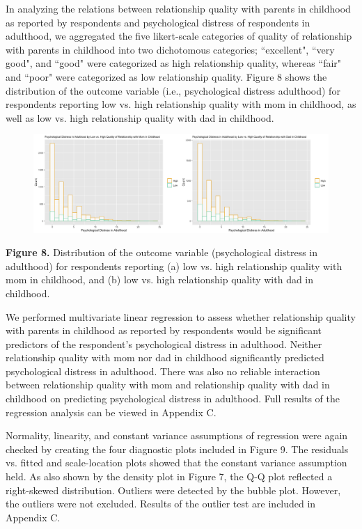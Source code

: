\documentclass[12pt,letterpaper]{article}
\begin{document}
In analyzing the relations between relationship quality with parents in childhood as reported by respondents and psychological distress of respondents in adulthood, we aggregated the five likert-scale categories of quality of relationship with parents in childhood into two dichotomous categories; ``excellent", ``very good", and ``good" were categorized as high relationship quality, whereas ``fair" and ``poor" were categorized as low relationship quality. Figure 8 shows the distribution of the outcome variable (i.e., psychological distress adulthood) for respondents reporting low vs. high relationship quality with mom in childhood, as well as low vs. high relationship quality with dad in childhood. 

\begin{figure}[H]
	\centering
	\includegraphics[scale=0.32]{histogram3.png}
\end{figure}	

\begin{center}
	\singlespacing
	\textbf{Figure 8.} Distribution of the outcome variable (psychological distress in adulthood) for respondents reporting (a) low vs. high relationship quality with mom in childhood, and (b) low vs. high relationship quality with dad in childhood. 
\end{center}

We performed multivariate linear regression to assess whether relationship quality with parents in childhood as reported by respondents would be significant predictors of the respondent's psychological distress in adulthood. Neither relationship quality with mom nor dad in childhood significantly predicted psychological distress in adulthood. There was also no reliable interaction between relationship quality with mom and relationship quality with dad in childhood on predicting psychological distress in adulthood. Full results of the regression analysis can be viewed in Appendix C. 

Normality, linearity, and constant variance assumptions of regression were again checked by creating the four diagnostic plots included in Figure 9.  The residuals vs. fitted  and scale-location plots showed that the constant variance assumption held. As also shown by the density plot in Figure 7, the Q-Q plot reflected a right-skewed distribution. Outliers were detected by the bubble plot. However, the outliers were not excluded. Results of the outlier test are included in Appendix C. 
\end{document}
